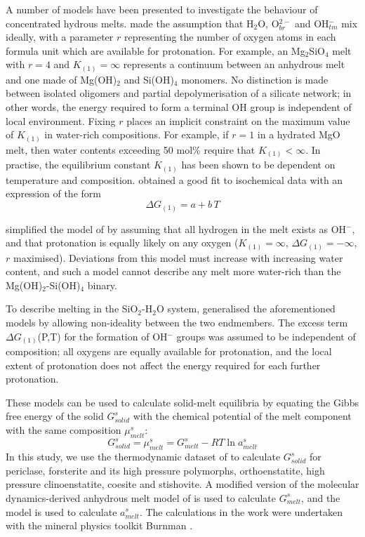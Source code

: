\documentclass[review]{elsarticle}
\begin{document}
A number of models have been presented to investigate the behaviour of concentrated hydrous melts. \cite{SS1985} made the assumption that H$_2$O, O$_{br}^{2-}$ and OH$_{tm}^-$ mix ideally, with a parameter $r$ representing the number of oxygen atoms in each formula unit which are available for protonation. For example, an Mg$_2$SiO$_4$ melt with $r=4$ and $K_{(1)}=\infty$ represents a continuum between an anhydrous melt and one made of Mg(OH)$_2$ and Si(OH)$_4$ monomers. No distinction is made between isolated oligomers and partial depolymerisation of a silicate network; in other words, the energy required to form a terminal OH group is independent of local environment. Fixing $r$ places an implicit constraint on the maximum value of $K_{(1)}$ in water-rich compositions. For example, if $r=1$ in a hydrated MgO melt, then water contents exceeding 50 mol\% require that $K_{(1)}<\infty$. In practise, the equilibrium constant $K_{(1)}$ has been shown to be dependent on temperature and composition. \cite{SK1995} obtained a good fit to isochemical data with an expression of the form
\begin{equation}
\Delta G_{(1)} = a + b\,T
\end{equation}

\cite{THH2012} simplified the model of \cite{SS1985} by assuming that all hydrogen in the melt exists as OH$^-$, and that protonation is equally likely on any oxygen ($K_{(1)}=\infty$, $\Delta G_{(1)}=-\infty$, $r$ maximised). Deviations from this model must increase with increasing water content, and such a model cannot describe any melt more water-rich than the Mg(OH)$_2$-Si(OH)$_4$ binary. 

To describe melting in the SiO$_2$-H$_2$O system, \cite{HM2012} generalised the aforementioned models by allowing non-ideality between the two endmembers. The excess term $\Delta G_{(1)}$(P,T) for the formation of OH$^-$ groups was assumed to be independent of composition; all oxygens are equally available for protonation, and the local extent of protonation does not affect the energy required for each further protonation.


These models can be used to calculate solid-melt equilibria by equating the Gibbs free energy of the solid $G^s_{solid}$ with the chemical potential of the melt component with the same composition $\mu^s_{melt}$:
\begin{equation}
G^s_{solid} = \mu^s_{melt} = G^s_{melt} - RT \ln a^s_{melt}
\label{eqn:equilibrium}
\end{equation}
In this study, we use the thermodynamic dataset of \cite{SLB2011} to calculate $G^s_{solid}$ for periclase, forsterite and its high pressure polymorphs, orthoenstatite, high pressure clinoenstatite, coesite and stishovite. A modified version of the molecular dynamics-derived anhydrous melt model of \cite{DKS2013} is used to calculate $G^s_{melt}$, and the \cite{SS1985} model is used to calculate $a^s_{melt}$. The calculations in the work were undertaken with the mineral physics toolkit Burnman \citep[available from \url{https://geodynamics.org/cig/software/burnman/}][]{CHRU2014}.
\end{document}
